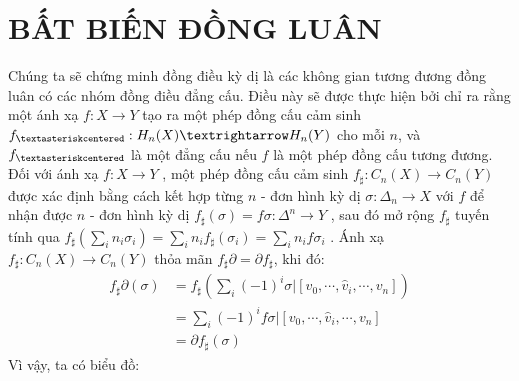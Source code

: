 \usetikzlibrary{%
	matrix,%
	calc,%
	arrows%
}
\chapter{BẤT BIẾN ĐỒNG LUÂN}

\indent Chúng ta sẽ chứng minh đồng điều kỳ dị là các không gian tương đương đồng luân có các nhóm đồng điều đẳng cấu. Điều này sẽ được thực hiện bởi chỉ ra rằng một ánh xạ \(f: X \rightarrow Y\) tạo ra một phép đồng cấu cảm sinh  \(f_{\textasteriskcentered} : H_n(X)→H_n(Y)\) cho mỗi \(n\), và \(f_{\textasteriskcentered}\) là một đẳng cấu nếu \(f\) là một phép đồng cấu tương đương. \\
\indent Đối với ánh xạ \(f: X \rightarrow Y\) , một phép đồng cấu cảm sinh \(f_{\sharp} : C_n(X) \rightarrow C_n(Y)\) được xác định bằng  cách  kết  hợp  từng  \(n\) - đơn  hình  kỳ dị \(\sigma : \Delta_{n} \rightarrow X\) với  \(f\)  để  nhận  được \(n\) - đơn  hình  kỳ  dị  \(f_{\sharp}(\sigma) = f\sigma : \Delta^{n} \rightarrow Y\) , sau đó mở rộng \(f_\sharp\) tuyến tính qua \(f_{\sharp}(\sum_{i}n_{i}\sigma_i) = \sum_{i}n_{i}f_{\sharp}(\sigma_i) = \sum_{i}n_{i}f\sigma_i\) . Ánh xạ \(f_{\sharp} : C_n(X) \rightarrow C_n(Y)\) thỏa mãn \( f_{\sharp}\partial = \partial f_{\sharp}\), khi đó:
\begin{equation*}\label{eq:pareto mle2}
\begin{aligned}
f_{\sharp}\partial(\sigma) & = f_{\sharp}(\sum_{i}(-1)^{i}\sigma|[v_0,\cdots,\hat{v}_{i},\cdots,v_n]) \\
& = \sum_{i}(-1)^{i}f\sigma|[v_0,\cdots,\hat{v}_{i},\cdots,v_n] \\
& = \partial f_{\sharp}(\sigma)
\end{aligned}
\end{equation*}
\newpage
Vì vậy, ta có biểu đồ: \\
 \\
